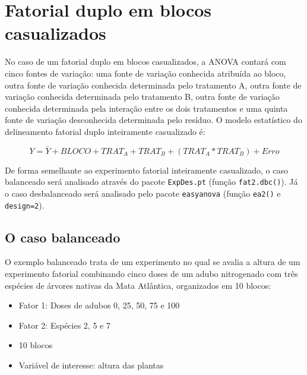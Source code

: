 \documentclass[
]{article}
\providecommand{\tightlist}{%
  \setlength{\itemsep}{0pt}\setlength{\parskip}{0pt}}
\begin{document}
\hypertarget{fatorial-duplo-em-blocos-casualizados}{%
\section{Fatorial duplo em blocos casualizados}\label{fatorial-duplo-em-blocos-casualizados}}

No caso de um fatorial duplo em blocos casualizados, a ANOVA contará com cinco fontes de variação: uma fonte de variação conhecida atribuída ao bloco, outra fonte de variação conhecida determinada pelo tratamento A, outra fonte de variação conhecida determinada pelo tratamento B, outra fonte de variação conhecida determinada pela interação entre os dois tratamentos e uma quinta fonte de variação desconhecida determinada pelo resíduo. O modelo estatístico do delineamento fatorial duplo inteiramente casualizado é:

\[Y = \bar{Y} + BLOCO + TRAT_A + TRAT_B + (TRAT_A * TRAT_B) + Erro\]

De forma semelhante ao experimento fatorial inteiramente casualizado, o caso balanceado será analisado através do pacote \texttt{ExpDes.pt} (função \texttt{fat2.dbc()}). Já o caso desbalanceado será analisado pelo pacote \texttt{easyanova} (função \texttt{ea2()} e \texttt{design=2}).

\hypertarget{o-caso-balanceado-3}{%
\subsection{O caso balanceado}\label{o-caso-balanceado-3}}

O exemplo balanceado trata de um experimento no qual se avalia a altura de um experimento fatorial combinando cinco doses de um adubo nitrogenado com três espécies de árvores nativas da Mata Atlântica, organizados em 10 blocos:

\begin{itemize}
\tightlist
\item
  Fator 1: Doses de adubos 0, 25, 50, 75 e 100
\item
  Fator 2: Espécies 2, 5 e 7
\item
  10 blocos
\item
  Variável de interesse: altura das plantas
\end{itemize}
\end{document}
